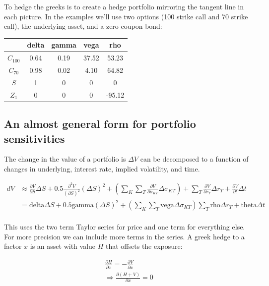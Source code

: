To hedge the greeks is to create a hedge portfolio mirroring the tangent line in each picture. In the examples we'll use two options (100 strike call and 70 strike call), the underlying asset, and a zero coupon bond: 

\begin{center}
\begin{tabular}{|c|cccc|}
\hline
 & delta & gamma & vega & rho\\
\hline
$C_{100}$ & 0.64 & 0.19 & 37.52 & 53.23\\
$C_{70}$ & 0.98 & 0.02 & 4.10 & 64.82\\
$S$ & 1  & 0 & 0 & 0\\ 
$Z_1$ & 0 & 0 & 0 & -95.12\\
\hline
\end{tabular}
\end{center}

\subsection{An almost general form for portfolio sensitivities}

The change in the value of a portfolio is $\Delta V$ can be decomposed to a function of changes in underlying, interest rate, implied volatility, and time.

\begin{eqnarray*}
dV &\approx \frac{\partial V}{\partial S} \Delta S + 0.5\frac{\partial^2V}{(\partial S)^2}(\Delta S)^2 + \left( \sum_K \sum_T \frac{\partial V}{\partial \sigma_{KT}} \Delta \sigma_{KT}  \right) + \sum_T \frac{\partial V}{\partial r_T} \Delta r_T + \frac{\partial V}{\partial t} \Delta t\\
 &= \mbox{delta}\Delta S + 0.5\mbox{gamma}(\Delta S)^2 +  \left( \sum_K \sum_T \mbox{vega}\Delta \sigma_{KT} \right) \sum_T \mbox{rho} \Delta r_T + \mbox{theta} \Delta t\\
\end{eqnarray*}

This uses the two term Taylor series for price and one term for everything else. For more precision we can include more terms in the series. A greek hedge to a factor $x$ is an asset with value $H$ that offsets the exposure:

\begin{eqnarray*}
\frac{\partial H}{\partial x} = -\frac{\partial V}{\partial x}\\
\Rightarrow \frac{\partial (H + V)}{\partial x} = 0
\end{eqnarray*}

